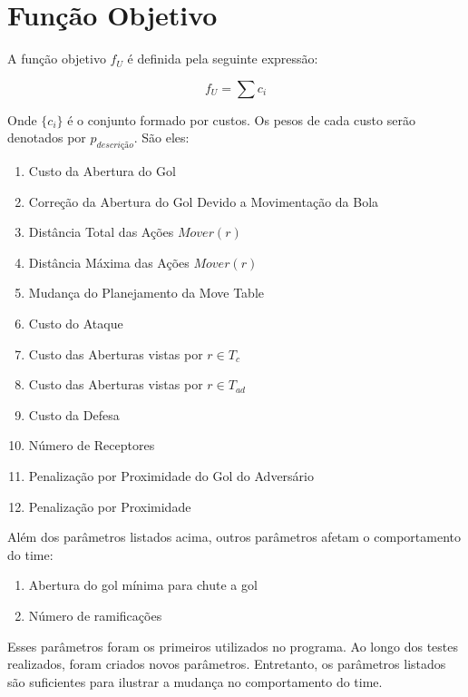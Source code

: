 \section{Função Objetivo}

A função objetivo $f_U$ é definida pela seguinte expressão:

\begin{dmath}
  f_U = \sum c_i 
\end{dmath}

Onde $\lbrace c_i \rbrace$ é o conjunto formado por custos. Os pesos de cada
custo serão denotados por $p_{descrição}$. São eles:
\begin{enumerate}
  \item Custo da Abertura do Gol
  \item Correção da Abertura do Gol Devido a Movimentação da Bola
  \item Distância Total das Ações $Mover(r)$
  \item Distância Máxima das Ações $Mover(r)$
  \item Mudança do Planejamento da Move Table
  \item Custo do Ataque
  \item Custo das Aberturas vistas por $r \in T_c$
  \item Custo das Aberturas vistas por $r \in T_{ad}$
  \item Custo da Defesa
  \item Número de Receptores
  \item Penalização por Proximidade do Gol do Adversário
  \item Penalização por Proximidade
\end{enumerate}

Além dos parâmetros listados acima, outros parâmetros afetam o comportamento do
time:
\begin{enumerate}
  \item Abertura do gol mínima para chute a gol
  \item Número de ramificações
\end{enumerate}

Esses parâmetros foram os primeiros utilizados no programa.  Ao longo dos testes
realizados, foram criados novos parâmetros.  Entretanto, os parâmetros listados
são suficientes para ilustrar a mudança no comportamento do time.


